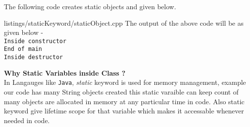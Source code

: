 \documentclass[oops.tex]{subfiles}
\begin{document}
\begin{enumerate}
          The following code creates static objects and given below.
           
          {listings/staticKeyword/staticObject.cpp}
          The output of the above code will be as given below - \\
          \texttt{Inside constructor}                           \\
          \texttt{End of main}                                  \\
          \texttt{Inside destructor}                            \\

\end{enumerate}

{\bf Why Static Variables inside Class ?}\\
In Langauges like \texttt{Java}, \emph{static} keyword is used for memory
management, example our code has many String objects created this static
varaible can keep count of many objects are allocated in memory at any
particular time in code. Also static keyword give lifetime scope for that
variable which makes it accessable whenever needed in code.
\end{document}
